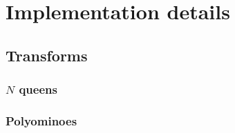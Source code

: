 
\chapter{Implementation details}
\label{implementation}




\section{Transforms}


\subsection{$N$ queens}




\subsection{Polyominoes}


